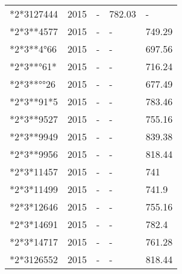 \begin{table}
\begin{tabular}[t]{lrlll}
*2*3127444 & 2015 & - & 782.03 & -\\
*2*3**4577 & 2015 & - & - & 749.29\\
*2*3**4°66 & 2015 & - & - & 697.56\\
*2*3**°61* & 2015 & - & - & 716.24\\
*2*3**°°26 & 2015 & - & - & 677.49\\
*2*3**91*5 & 2015 & - & - & 783.46\\
*2*3**9527 & 2015 & - & - & 755.16\\
*2*3**9949 & 2015 & - & - & 839.38\\
*2*3**9956 & 2015 & - & - & 818.44\\
*2*3*11457 & 2015 & - & - & 741\\
*2*3*11499 & 2015 & - & - & 741.9\\
*2*3*12646 & 2015 & - & - & 755.16\\
*2*3*14691 & 2015 & - & - & 782.4\\
*2*3*14717 & 2015 & - & - & 761.28\\
*2*3126552 & 2015 & - & - & 818.44\\
\bottomrule
\end{tabular}
\end{table}